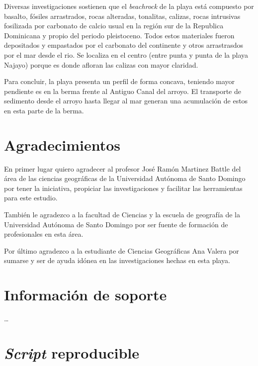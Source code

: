 \documentclass[11pt,]{article}
\begin{document}
Diversas investigaciones sostienen que el \emph{beachrock} de la playa
está compuesto por basalto, fósiles arrastrados, rocas alteradas,
tonalitas, calizas, rocas intrusivas fosilizada por carbonato de calcio
usual en la región sur de la Republica Dominicana y propio del periodo
pleistoceno. Todos estos materiales fueron depositados y empastados por
el carbonato del continente y otros arrastrasdos por el mar desde el
rio. Se localiza en el centro (entre punta y punta de la playa Najayo)
porque es donde afloran las calizas con mayor claridad.

Para concluir, la playa presenta un perfil de forma concava, teniendo
mayor pendiente es en la berma frente al Antiguo Canal del arroyo. El
transporte de sedimento desde el arroyo hasta llegar al mar generan una
acumulación de estos en esta parte de la berma.

\section{Agradecimientos}\label{agradecimientos}

En primer lugar quiero agradecer al profesor José Ramón Martinez Battle
del área de las ciencias geográficas de la Universidad Autónoma de Santo
Domingo por tener la iniciativa, propiciar las investigaciones y
facilitar las herramientas para este estudio.

También le agradezco a la facultad de Ciencias y la escuela de geografía
de la Universidad Autónoma de Santo Domingo por ser fuente de formación
de profesionales en esta área.

Por último agradezco a la estudiante de Ciencias Geográficas Ana Valera
por sumarse y ser de ayuda idónea en las investigaciones hechas en esta
playa.

\section{Información de soporte}\label{informaciuxf3n-de-soporte}

\ldots

\section{\texorpdfstring{\emph{Script}
reproducible}{Script reproducible}}\label{script-reproducible}
\end{document}
